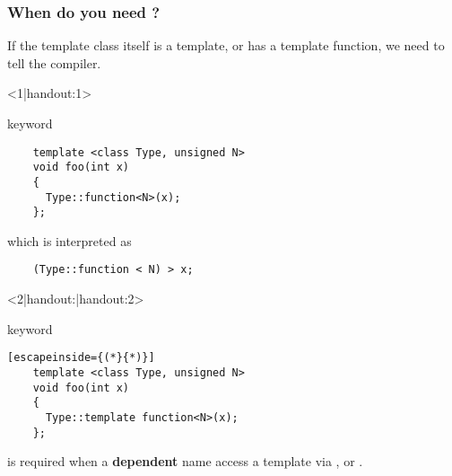 \documentclass[11pt,a4paper,dvipsnames,usenames]{beamer}
\begin{document}
\begin{frame}[fragile]
  \frametitle{When do you need ?}

  \vfill

  If the template class itself is a template, or has a template function, we need to tell the compiler.

  \vfill

  \begin{onlyenv}<1|handout:1>
  \begin{exampleblock}{ keyword}
    \begin{lstlisting}
    template <class Type, unsigned N>
    void foo(int x)
    {
      Type::function<N>(x);
    };
    \end{lstlisting}
  \end{exampleblock}

  \vfill

  which is interpreted as

  \begin{lstlisting}
    (Type::function < N) > x;
  \end{lstlisting}
  \end{onlyenv}

  \begin{onlyenv}<2|handout:|handout:2>
  \begin{exampleblock}{ keyword}
    \begin{lstlisting}[escapeinside={(*}{*)}]
    template <class Type, unsigned N>
    void foo(int x)
    {
      Type::template function<N>(x);
    };
    \end{lstlisting}
  \end{exampleblock}

  \vfill

   is required when a \textbf{dependent} name access a template via , \inline{->} or \inline{::}.
  \end{onlyenv}

  \vfill

\end{frame}
\end{document}
